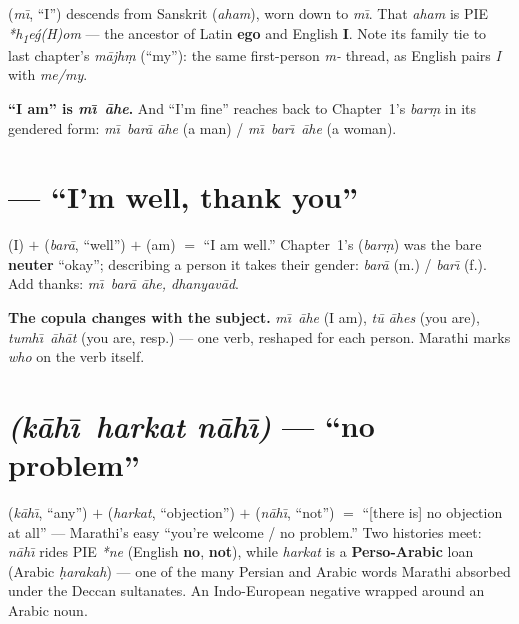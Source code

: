 \begin{cousinweb}
 (\emph{m\=\i}, ``I'') descends from Sanskrit  (\emph{aham}),
worn down to \emph{m\=\i}. That \emph{aham} is PIE
\emph{*h\textsubscript{1}e\'{g}(H)om} --- the ancestor of Latin \textbf{ego} and
English \textbf{I}. Note its family tie to last chapter's \emph{m\=ajh\d{m}}
(``my''): the same first-person \emph{m-} thread, as English pairs \emph{I} with
\emph{me/my}.
\end{cousinweb}

\begin{grammarlens}
\textbf{``I am'' is \emph{m\=\i\ \=ahe}.} And ``I'm fine'' reaches back to
Chapter~1's \emph{bar\d{m}} in its gendered form: \emph{m\=\i\ bar\=a \=ahe}
(a man) / \emph{m\=\i\ bar\=\i\ \=ahe} (a woman).
\end{grammarlens}

\section{ --- ``I'm well, thank you''}
\label{lesson:mi-bara-aahe}

 (I) $+$  (\emph{bar\=a}, ``well'') $+$  (am) $=$ ``I am
well.'' Chapter~1's  (\emph{bar\d{m}}) was the bare \textbf{neuter}
``okay''; describing a person it takes their gender: \emph{bar\=a} (m.) /
\emph{bar\=\i} (f.). Add thanks: \emph{m\=\i\ bar\=a \=ahe, dhanyav\=ad}.

\begin{grammarlens}
\textbf{The copula changes with the subject.} \emph{m\=\i\ \=ahe} (I am), \emph{t\=u
\=ahes} (you are), \emph{tumh\=\i\ \=ah\=at} (you are, resp.) --- one verb,
reshaped for each person. Marathi marks \emph{who} on the verb itself.
\end{grammarlens}

\section{ \emph{(k\=ah\=\i\ harkat n\=ah\=\i)} --- ``no problem''}
\label{lesson:kaahi-harkat-nahi}

\begin{cousinweb}
 (\emph{k\=ah\=\i}, ``any'') $+$  (\emph{harkat}, ``objection'')
$+$  (\emph{n\=ah\=\i}, ``not'') $=$ ``[there is] no objection at all''
--- Marathi's easy ``you're welcome / no problem.'' Two histories meet:
\emph{n\=ah\=\i} rides PIE \emph{*ne} (English \textbf{no}, \textbf{not}), while
\emph{harkat} is a \textbf{Perso-Arabic} loan (Arabic \emph{\d{h}arakah}) --- one
of the many Persian and Arabic words Marathi absorbed under the Deccan
sultanates. An Indo-European negative wrapped around an Arabic noun.
\end{cousinweb}

